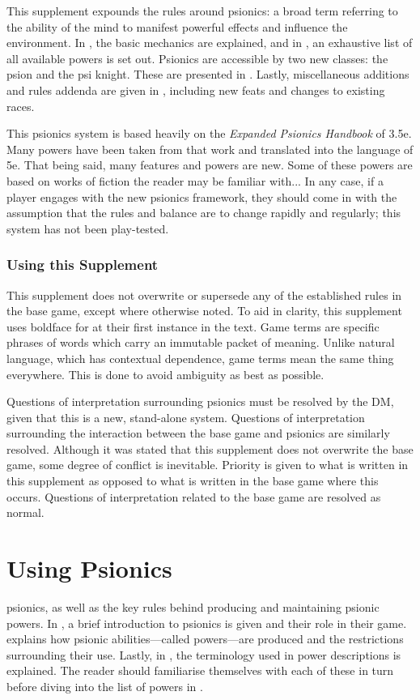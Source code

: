 This supplement expounds the rules around psionics:
a broad term referring to the ability of the mind to manifest
powerful effects and influence the environment.
In ,
the basic mechanics are explained,
and in ,
an exhaustive list of all available powers is set out.\newpage
Psionics are accessible by two new classes: the psion
and the psi knight.
These are presented in .
Lastly, miscellaneous additions and rules addenda
are given in ,
including new feats and changes to existing races.

This psionics system is based heavily on the
\emph{Expanded Psionics Handbook} of 3.5e.
Many powers have been taken from that work
and translated into the language of 5e.
That being said, many features and powers are new.
Some of these powers are based on works of fiction
the reader may be familiar with...
In any case,
if a player engages with the new psionics framework,
they should come in with the assumption that the rules
and balance are to change rapidly and regularly;
this system has not been play-tested.

\subsection*{Using this Supplement}
This supplement does not overwrite or supersede any
of the established rules in the base game,
except where otherwise noted.
To aid in clarity,
this supplement uses boldface for 
at their first instance in the text.
Game terms are specific phrases of words which
carry an immutable packet of meaning.
Unlike natural language,
which has contextual dependence,
game terms mean the same thing everywhere.
This is done to avoid ambiguity as best as possible.

Questions of interpretation surrounding psionics
must be resolved by the DM,
given that this is a new, stand-alone system.
Questions of interpretation surrounding the interaction
between the base game and psionics are similarly resolved.
Although it was stated that this supplement does not
overwrite the base game,
some degree of conflict is inevitable.
Priority is given to what is written in this supplement
as opposed to what is written in the base game
where this occurs.
Questions of interpretation related to the base game
are resolved as normal.

\chapter{Using Psionics}
\label{chap:using_psionics}
psionics, as well as the key rules behind
producing and maintaining psionic powers.
In ,
a brief introduction to psionics is given
and their role in their game.
 explains how
psionic abilities---called powers---are produced
and the restrictions surrounding their use.
Lastly,
in ,
the terminology used in power descriptions is explained.
The reader should familiarise themselves with each of these in turn
before diving into
the list of powers in .

